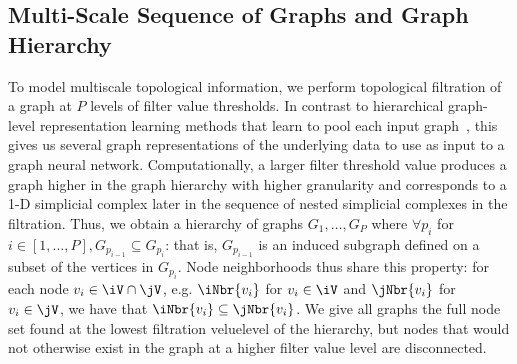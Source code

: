 
\subsection{Multi-Scale Sequence of Graphs and Graph Hierarchy}
\label{sSec:graph_hier}

To model multiscale topological information, we perform topological filtration of a graph at $P$ levels of filter value thresholds. In contrast to hierarchical graph-level representation learning methods that learn to pool each input graph~\cite{ying2018hierarchical}, this gives us several graph representations of the underlying data to use as input to a graph neural network. Computationally, a larger filter threshold value produces a graph higher in the graph hierarchy with higher granularity and corresponds to a 1-D simplicial complex later in the sequence of nested simplicial complexes in the filtration.  Thus, we obtain a hierarchy of graphs $G_1, \ldots, G_P$ where  $\forall p_i$ for $i \in [1, \ldots, P], G_{p_{i-1}} \subseteq G_{p_i}$: that is, $G_{p_{i-1}}$ is an induced subgraph defined on a subset of the vertices in $G_{p_i}$. %
Node neighborhoods thus share this property: for each node $v_i \in \iV \cap \jV$, e.g. $\iNbr{v_i}$ for $v_i \in \iV$ and $\jNbr{v_i}$ for $v_i \in \jV$, we have that $\iNbr{v_i} \subseteq \jNbr{v_i}$. %
We give all graphs the full node set found at the lowest filtration veluelevel of the hierarchy, but nodes that would not otherwise exist in the graph at a higher filter value level are disconnected.%
